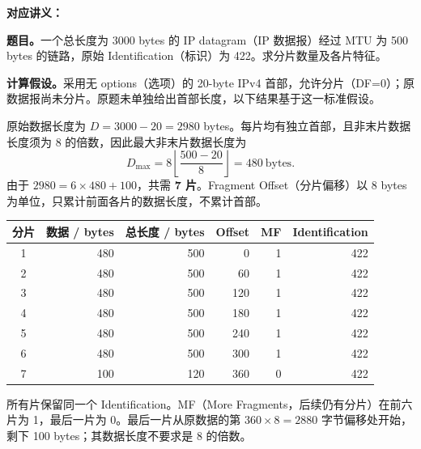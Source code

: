 
\textbf{对应讲义：}

\textbf{题目。}一个总长度为 3000 bytes 的 IP datagram（IP 数据报）经过 MTU 为 500 bytes 的链路，原始 Identification（标识）为 422。求分片数量及各片特征。

\textbf{计算假设。}采用无 options（选项）的 20-byte IPv4 首部，允许分片（DF=0）；原数据报尚未分片。原题未单独给出首部长度，以下结果基于这一标准假设。

\begin{checkedsolution}
原始数据长度为 $D=3000-20=2980$ bytes。每片均有独立首部，且非末片数据长度须为 8 的倍数，因此最大非末片数据长度为
\[
  D_{\max}=8\left\lfloor\frac{500-20}{8}\right\rfloor=480\ \mathrm{bytes}.
\]
由于 $2980=6\times480+100$，共需 \textbf{7 片}。Fragment Offset（分片偏移）以 8 bytes 为单位，只累计前面各片的数据长度，不累计首部。

\begin{center}
\small
\begin{tabular}{@{}crrrrr@{}}
\toprule
分片 & 数据 / bytes & 总长度 / bytes & Offset & MF & Identification \\
\midrule
1 & 480 & 500 & 0 & 1 & 422 \\
2 & 480 & 500 & 60 & 1 & 422 \\
3 & 480 & 500 & 120 & 1 & 422 \\
4 & 480 & 500 & 180 & 1 & 422 \\
5 & 480 & 500 & 240 & 1 & 422 \\
6 & 480 & 500 & 300 & 1 & 422 \\
7 & 100 & 120 & 360 & 0 & 422 \\
\bottomrule
\end{tabular}
\end{center}

所有片保留同一个 Identification。MF（More Fragments，后续仍有分片）在前六片为 1，最后一片为 0。最后一片从原数据的第 $360\times8=2880$ 字节偏移处开始，剩下 100 bytes；其数据长度不要求是 8 的倍数。
\end{checkedsolution}
